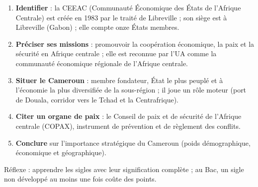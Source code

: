 \documentclass[11pt]{article}
\newcommand{\cle}[1]{{\popxbold\color{popdark}#1}}
\begin{document}
\begin{methode}
\begin{enumerate}
\item \textbf{Identifier} : la \cle{CEEAC} (Communauté Économique des États de l'Afrique Centrale) est créée en 1983 par le traité de Libreville ; son siège est à Libreville (Gabon) ; elle compte onze États membres.
\item \textbf{Préciser ses missions} : promouvoir la coopération économique, la paix et la sécurité en Afrique centrale ; elle est reconnue par l'UA comme la communauté économique régionale de l'Afrique centrale.
\item \textbf{Situer le Cameroun} : membre fondateur, État le plus peuplé et à l'économie la plus diversifiée de la sous-région ; il joue un rôle moteur (port de Douala, corridor vers le Tchad et la Centrafrique).
\item \textbf{Citer un organe de paix} : le Conseil de paix et de sécurité de l'Afrique centrale (COPAX), instrument de prévention et de règlement des conflits.
\item \textbf{Conclure} sur l'importance stratégique du Cameroun (poids démographique, économique et géographique).
\end{enumerate}
Réflexe : apprendre les sigles avec leur signification complète ; au Bac, un sigle non développé au moins une fois coûte des points.
\end{methode}
\end{document}
